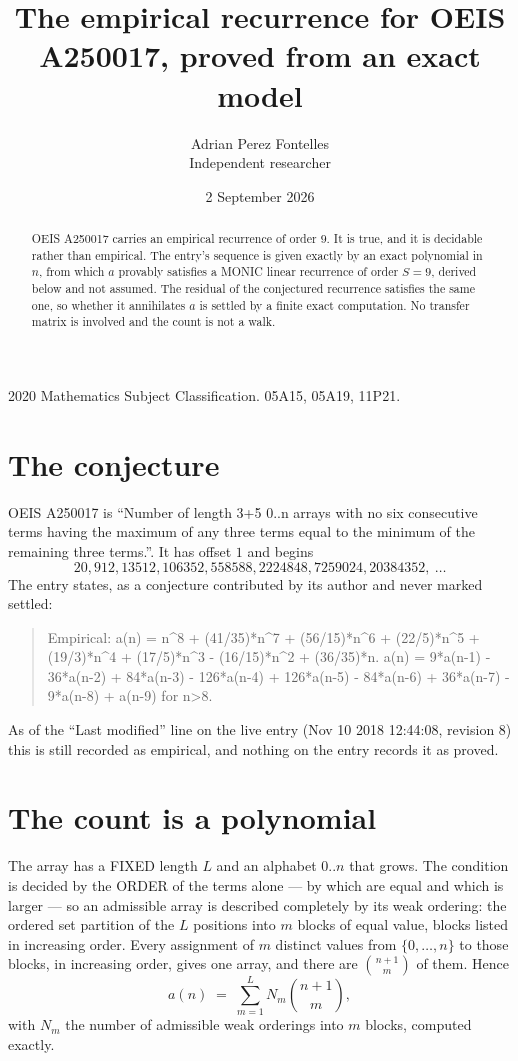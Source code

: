 \documentclass[11pt,a4paper]{article}
\title{The empirical recurrence for OEIS A250017, proved from an exact model}
\author{Adrian Perez Fontelles\\ \small Independent researcher}
\date{2 September 2026}
\theoremstyle{plain}
\theoremstyle{definition}
\begin{document}
\maketitle

\begin{abstract}
OEIS A250017 carries an empirical recurrence of order $9$. It is true, and it is
decidable rather than empirical. The entry's sequence is given exactly by an exact polynomial in $n$, from
which $a$ provably satisfies a MONIC linear recurrence of order $S=9$, derived below and not
assumed. The residual of the conjectured recurrence satisfies the same one, so whether it
annihilates $a$ is settled by a finite exact computation. No transfer matrix is involved and
the count is not a walk.
\end{abstract}

\noindent\small 2020 Mathematics Subject Classification. 05A15, 05A19, 11P21.\normalsize

\section{The conjecture}

OEIS A250017 is ``Number of length 3+5 0..n arrays with no six consecutive terms having the maximum of any three terms equal to the minimum of the remaining three terms.''. It has offset $1$ and begins
\[
20, 912, 13512, 106352, 558588, 2224848, 7259024, 20384352,\ \dots
\]
The entry states, as a conjecture contributed by its author and never marked settled:
\begin{quote}
Empirical: a(n) = n\^{}8 + (41/35)*n\^{}7 + (56/15)*n\^{}6 + (22/5)*n\^{}5 + (19/3)*n\^{}4 + (17/5)*n\^{}3 - (16/15)*n\^{}2 + (36/35)*n. a(n) = 9*a(n-1) - 36*a(n-2) + 84*a(n-3) - 126*a(n-4) + 126*a(n-5) - 84*a(n-6) + 36*a(n-7) - 9*a(n-8) + a(n-9) for n>8.
\end{quote}
As of the ``Last modified'' line on the live entry (Nov 10 2018 12:44:08, revision 8)
this is still recorded as empirical, and nothing on the entry records it as proved.

\section{The count is a polynomial}

The array has a FIXED length $L$ and an alphabet $0..n$ that grows. The condition is decided by
the ORDER of the terms alone --- by which are equal and which is larger --- so an admissible
array is described completely by its weak ordering: the ordered set partition of the $L$
positions into $m$ blocks of equal value, blocks listed in increasing order. Every assignment
of $m$ distinct values from $\{0,\dots,n\}$ to those blocks, in increasing order, gives one
array, and there are $\binom{n+1}{m}$ of them. Hence
\[
a(n)\;=\;\sum_{m=1}^{L} N_m\binom{n+1}{m},
\]
with $N_m$ the number of admissible weak orderings into $m$ blocks, computed exactly.
\end{document}
